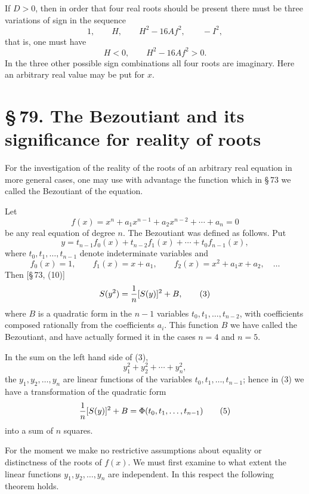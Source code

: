 \documentclass[11pt]{article}
\providecommand{\sect}[2]{\section*{\S\,#1. #2}}
\begin{document}
If $D>0$, then in order that four real roots should be present there must be three variations of sign in the sequence
\[
        1,
        \qquad H,
        \qquad H^2-16Af^2,
        \qquad -I^2,
\]
that is, one must have
\[
        H<0,
        \qquad H^2-16Af^2>0.
\]
In the three other possible sign combinations all four roots are imaginary. Here an arbitrary real value may be put for $x$.

\sect{79}{The Bezoutiant and its significance for reality of roots}

For the investigation of the reality of the roots of an arbitrary real equation in more general cases, one may use with advantage the function which in \S\,73 we called the Bezoutiant of the equation.

Let
\begin{equation}
        f(x)=x^n+a_1x^{n-1}+a_2x^{n-2}+\cdots+a_n=0
\tag{1}
\end{equation}
be any real equation of degree $n$. The Bezoutiant was defined as follows. Put
\begin{equation}
        y=t_{n-1}f_0(x)+t_{n-2}f_1(x)+\cdots+t_0f_{n-1}(x),
\tag{2}
\end{equation}
where $t_0,t_1,\ldots,t_{n-1}$ denote indeterminate variables and
\[
 f_0(x)=1,
 \qquad f_1(x)=x+a_1,
 \qquad f_2(x)=x^2+a_1x+a_2,
 \quad\ldots
\]
Then [\S\,73, (10)]
\begin{equation}
        S(y^2)={1\over n}[S(y)]^2+B,
\tag{3}
\end{equation}
where $B$ is a quadratic form in the $n-1$ variables $t_0,t_1,\ldots,t_{n-2}$, with coefficients composed rationally from the coefficients $a_i$. This function $B$ we have called the Bezoutiant, and have actually formed it in the cases $n=4$ and $n=5$.

In the sum on the left hand side of (3),
\begin{equation}
        y_1^2+y_2^2+\cdots+y_n^2,
\tag{4}
\end{equation}
the $y_1,y_2,\ldots,y_n$ are linear functions of the variables $t_0,t_1,\ldots,t_{n-1}$; hence in (3) we have a transformation of the quadratic form
\begin{equation}
        {1\over n}[S(y)]^2+B=\Phi(t_0,t_1,\ldots,t_{n-1})
\tag{5}
\end{equation}
into a sum of $n$ squares.

For the moment we make no restrictive assumptions about equality or distinctness of the roots of $f(x)$. We must first examine to what extent the linear functions $y_1,y_2,\ldots,y_n$ are independent. In this respect the following theorem holds.
\end{document}
